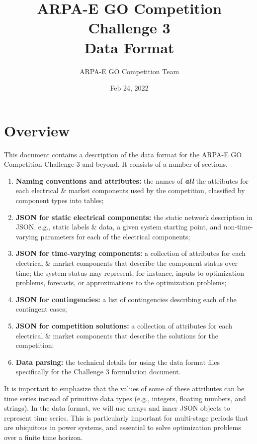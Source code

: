 \documentclass{article}
\title{ARPA-E GO Competition Challenge 3 \\ Data Format}
\author{ARPA-E GO Competition Team}
\date{Feb 24, 2022}
\begin{document}
\maketitle

\section{Overview}

This document contains a description of the data format for the ARPA-E GO Competition Challenge 3 and beyond. It consists of a number of sections.
\begin{enumerate}[I]
    \item {\bf Naming conventions and attributes:} the names of \textit{\textbf{all}} the attributes for each electrical \& market components used by the competition, classified by component types into tables;

    \item {\bf JSON for static electrical components:} the static network description in JSON, e.g., static labels \& data, a given system starting point, and non-time-varying parameters for each of the electrical components;

    \item {\bf JSON for time-varying components:} a collection of attributes for each electrical \& market components that describe the component status over time; the system status may represent, for instance, inputs to optimization problems,  forecasts, or approximations to the optimization problems;
    \item {\bf JSON for contingencies:} a list of contingencies describing each of the contingent cases;
    \item {\bf JSON for competition solutions:} a collection of attributes for each electrical \& market components that describe the solutions for the competition;    
     \item {\bf Data parsing:}
     the technical details for using the data format files specifically for the Challenge 3 formulation document.
\end{enumerate}
It is important to emphasize that the values of some of these attributes can be time series instead of primitive data types (e.g., integers, floating numbers, and strings). 
In the data format, we will use arrays and inner JSON objects to represent time series. 
This is particularly important for multi-stage periods that are ubiquitous in power systems, and essential 
to solve optimization problems over a finite time horizon. 
\end{document}
